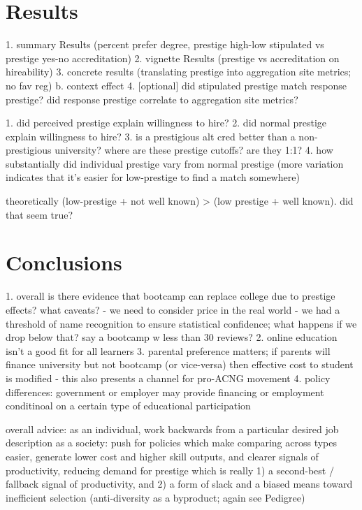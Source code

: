 \documentclass[review]{elsarticle}
\begin{document}
\section{Results}

1. summary Results (percent prefer degree, prestige high-low stipulated vs prestige yes-no accreditation)
2. vignette Results (prestige vs accreditation on hireability)
3. concrete results (translating prestige into aggregation site metrics; no fav reg)
    b. context effect
4. [optional] did stipulated prestige match response prestige? did response prestige correlate to aggregation site metrics?

1. did perceived prestige explain willingness to hire?
2. did normal prestige explain willingness to hire?
3. is a prestigious alt cred better than a non-prestigious university? where are these prestige cutoffs? are they 1:1?
4. how substantially did individual prestige vary from normal prestige (more variation indicates that it's easier for low-prestige to find a match somewhere)

theoretically (low-prestige + not well known) > (low prestige + well known). did that seem true?

\section{Conclusions}

1. overall is there evidence that bootcamp can replace college due to prestige effects? what caveats?
- we need to consider price in the real world
- we had a threshold of name recognition to ensure statistical confidence; what happens if we drop below that? say a bootcamp w less than 30 reviews?
2. online education isn't a good fit for all learners
3. parental preference matters; if parents will finance university but not bootcamp (or vice-versa) then effective cost to student is modified
- this also presents a channel for pro-ACNG movement
4. policy differences: government or employer may provide financing or employment conditinoal on a certain type of educational participation

overall advice: as an individual, work backwards from a particular desired job description
as a society: push for policies which make comparing across types easier, generate lower cost and higher skill outputs,
and clearer signals of productivity, reducing demand for prestige which is really 1) a second-best / fallback signal of productivity,
and 2) a form of slack and a biased means toward inefficient selection (anti-diversity as a byproduct; again see Pedigree)


\end{document}
